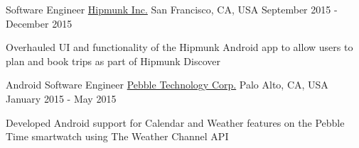 \begin{center}
  \vspace{-2.7mm}
  \cventry
    {Software Engineer}
    {\href{http://hipmunk.com/mobile}{Hipmunk Inc.}}
    {San Francisco, CA, USA}
    {September 2015 - December 2015}
    {
      \begin{cvitems}
        \item {Overhauled UI and functionality of the Hipmunk Android app to allow users to plan and book trips as part of Hipmunk Discover}
      \end{cvitems}
    }
\end{center}
\begin{center}
  \vspace{-2.7mm}
  \cventry
    {Android Software Engineer}
    {\href{http://pebble.com/apps}{Pebble Technology Corp.}}
    {Palo Alto, CA, USA}
    {January 2015 - May 2015}
    {
      \begin{cvitems}
        \item {Developed Android support for Calendar and Weather features on the Pebble Time smartwatch using The Weather Channel API}
      \end{cvitems}
    }
\end{center}

